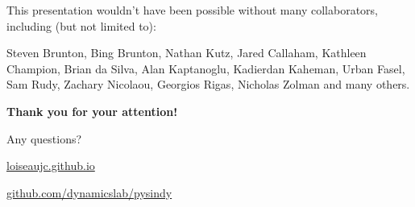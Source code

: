 \documentclass[aspectratio=169,compress,12pt]{beamer}
\begin{document}

\End

\begin{frame}
    This presentation wouldn't have been possible without many collaborators, including (but not limited to): 
    
    Steven Brunton, Bing Brunton, Nathan Kutz, Jared Callaham, Kathleen Champion, Brian da Silva, Alan Kaptanoglu, Kadierdan Kaheman, Urban Fasel, Sam Rudy, Zachary Nicolaou, Georgios Rigas, Nicholas Zolman and many others.
\end{frame}

\begin{frame}
    \vfill
    \begin{minipage}{.68\textwidth}
        {
        \Large
        \textbf{Thank you for your attention!}
        }
        \par\bigskip
        {
        Any questions?
        }
    \end{minipage}%
    \hfill
    \begin{minipage}{.28\textwidth}
        \centering
        \scalebox{4}{\faGithub} \par\bigskip
        \tiny
        \url{loiseaujc.github.io}
        \par\medskip
        \url{github.com/dynamicslab/pysindy}
    \end{minipage}
    \vfill
    \end{frame}
\end{document}
